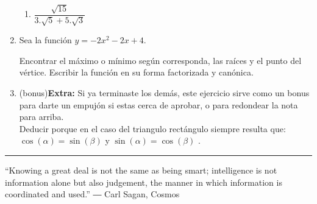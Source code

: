 \documentclass[a4paper,12pt]{exam}
\begin{document}
\begin{enumerate}
\begin{enumerate}
\item $ \dfrac{\sqrt{15}}{3.\sqrt{5}+5.\sqrt{3}}  $
\end{enumerate}

\item Sea la función $y=-2x^2-2x+4$.

Encontrar el máximo o mínimo según corresponda, las raíces y el punto del vértice. 
Escribir la función en su forma factorizada y canónica.
 
\item (bonus)\textbf{Extra:}
Si ya terminaste los demás, este ejercicio sirve como un bonus para darte un empujón si estas cerca de aprobar, o para redondear la nota para arriba.\\
 

Deducir porque en el caso del triangulo rectángulo siempre resulta que: $\cos(\alpha)=\sin(\beta)$ y $\sin(\alpha)=\cos(\beta)$ .

 
\end{enumerate}

\rule[2ex]{\textwidth}{2pt}

“Knowing a great deal is not the same as being smart; intelligence is not information alone but also judgement, the manner in which information is coordinated and used.”
― Carl Sagan, Cosmos 






\end{document}
